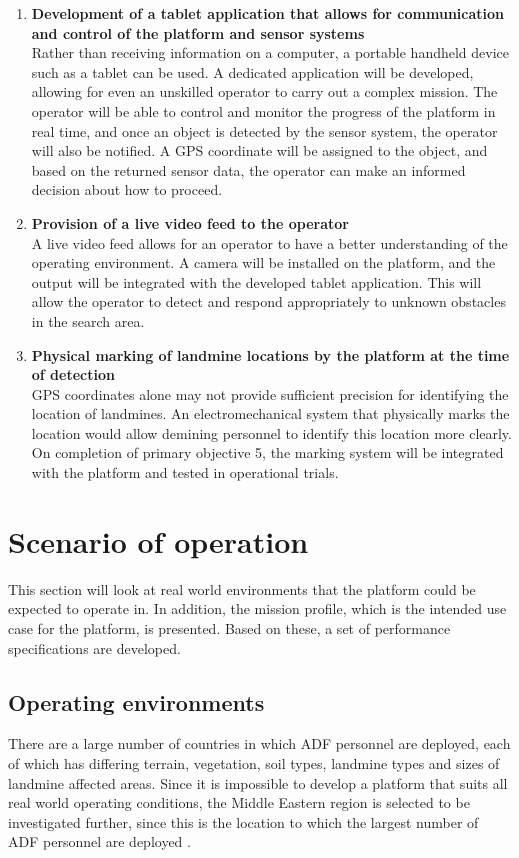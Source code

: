 \documentclass[main.tex]{subfiles}
\begin{document}
\begin{enumerate}
\item \textbf{Development of a tablet application that allows for communication and control of the platform and sensor systems}\\ 
Rather than receiving information on a computer, a portable handheld device such as a tablet can be used. 
A dedicated application will be developed, allowing for even an unskilled operator to carry out a complex mission. 
The operator will be able to control and monitor the progress of the platform in real time, and once an object is detected by the sensor system, the operator will also be notified. 
A GPS coordinate will be assigned to the object, and based on the returned sensor data, the operator can make an informed decision about how to proceed.

\item \textbf{Provision of a live video feed to the operator}\\ 
A live video feed allows for an operator to have a better understanding of the operating environment. 
A camera will be installed on the platform, and the output will be integrated with the developed tablet application. 
This will allow the operator to detect and respond appropriately to unknown obstacles in the search area. 

\item \textbf{Physical marking of landmine locations by the platform at the time of detection}\\ GPS coordinates alone may not provide sufficient precision for identifying the location of landmines. 
An electromechanical system that physically marks the location would allow demining personnel to identify this location more clearly. 
On completion of primary objective 5, the marking system will be integrated with the platform and tested in operational trials. 

\end{enumerate}

\section{Scenario of operation}
This section will look at real world environments that the platform could be expected to operate in. In addition, the mission profile, which is the intended use case for the platform, is presented. Based on these, a set of performance specifications are developed.  

\subsection{Operating environments}
There are a large number of countries in which ADF personnel are deployed, each of which has differing terrain, vegetation, soil types, landmine types and sizes of landmine affected areas. Since it is impossible to develop a platform that suits all real world operating conditions, the Middle Eastern region is selected to be investigated further, since this is the location to which the largest number of ADF personnel are deployed \parencite{AustralianGovernment2016}. 
\end{document}
